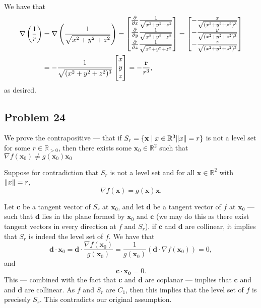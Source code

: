\documentclass[11pt]{article}
\renewcommand{\vec}[1]{\mathbf{#1}}
\renewcommand{\grad}{\nabla}
\begin{document}
We have that
\begin{align*}
	\grad \left( \frac{1}{r} \right) &= \grad \left( \frac{1}{\sqrt{x^{2} + y^{2} + z^{2}}} \right) = \begin{bmatrix} \pdv{x} \frac{1}{\sqrt{x^{2} + y^{2} + z^{2}}} \\ \pdv{y} \frac{1}{\sqrt{x^{2} + y^{2} + z^{2}}} \\ \pdv{z} \frac{1}{\sqrt{x^{2} + y^{2} + z^{2}}} \end{bmatrix} = \begin{bmatrix} -\frac{x}{\sqrt{(x^{2} + y^{2} + z^{2})^{3}}} \\ -\frac{y}{\sqrt{(x^{2} + y^{2} + z^{2})^{3}}} \\ -\frac{z}{\sqrt{(x^{2} + y^{2} + z^{2})^{3}}} \end{bmatrix} \\
	&= -\frac{1}{\sqrt{(x^{2} + y^{2} + z^{2})^{3}}} \begin{bmatrix} x \\ y \\ z \end{bmatrix} = -\frac{\mathbf{r}}{r^{3}},
\end{align*}
as desired.


\subsection{Problem 24}

We prove the contrapositive --- that if $S_{r} = \{ \vec{x} \mid x \in \mathbb{R}^{3} \norm{x} = r \}$ is not a level set for some $r \in \mathbb{R}_{> 0}$, then there exists some $\vec{x}_{0} \in \mathbb{R}^{2}$ such that $\grad f (\vec{x}_{0}) \ne g(\vec{x}_{0}) \vec{x}_{0}$

Suppose for contradiction that $S_{r}$ is not a level set and for all $\vec{x} \in \mathbb{R}^{2}$ with $\norm{x} = r$,
\[
	\grad f(\vec{x}) = g(\vec{x}) \vec{x}. 
\]

Let $\vec{c}$ be a tangent vector of $S_{r}$ at $\vec{x}_{0}$, and let $\vec{d}$ be a tangent vector of $f$ at $\vec{x}_{0}$ --- such that $\vec{d}$ lies in the plane formed by $\vec{x}_{0}$ and $\vec{c}$ (we may do this as there exist tangent vectors in every direction at $f$ and $S_{r}$). if $\vec{c}$ and $\vec{d}$ are collinear, it implies that $S_{r}$ is indeed the level set of $f$. We have that
\[
	\vec{d} \cdot \vec{x}_{0} = \vec{d} \cdot \frac{\grad f(\vec{x}_{0})}{g(\vec{x}_{0})} = \frac{1}{g(\vec{x}_{0})} (\vec{d} \cdot \grad f(\vec{x}_{0})) = 0,
\]
and
\[
	\vec{c} \cdot \vec{x_{0}} = 0.
\]
This --- combined with the fact that $\vec{c}$ and $\vec{d}$ are coplanar --- implies that $\vec{c}$ and and $\vec{d}$ are collinear. As $f$ and $S_{r}$ are $C_{1}$, then this implies that the level set of $f$ is precisely $S_{r}$. This contradicts our original assumption.
\end{document}
